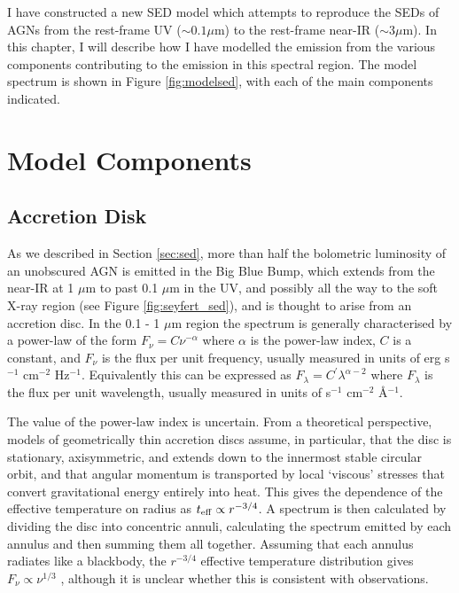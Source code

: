I have constructed a new SED model which attempts to reproduce the SEDs of AGNs from the rest-frame UV ($\sim 0.1 \mu$m) to the rest-frame near-IR ($\sim 3 \mu$m). In this chapter, I will describe how I have modelled the emission from the various components contributing to the emission in this spectral region. The model spectrum is shown in Figure \ref{fig:modelsed}, with each of the main components indicated. 

\section{Model Components}

\subsection{Accretion Disk}

As we described in Section \ref{sec:sed}, more than half the bolometric luminosity of an unobscured AGN is emitted in the Big Blue Bump, which extends from the near-IR at 1 $\mu$m to past 0.1 $\mu$m in the UV, and possibly all the way to the soft X-ray region (see Figure \ref{fig:seyfert_sed}), and is thought to arise from an accretion disc. In the 0.1 - 1 $\mu$m region the spectrum is generally characterised by a power-law of the form $F_\nu = C\nu^{-\alpha}$ where $\alpha$ is the power-law index, $C$ is a constant, and $F_\nu$ is the flux per unit frequency, usually measured in units of erg s$^{-1}$ cm$^{-2}$ Hz$^{-1}$. Equivalently this can be expressed as $F_\lambda = C^\prime\lambda^{\alpha - 2}$ where $F_\lambda$ is the flux per unit wavelength, usually measured in units of s$^{-1}$ cm$^{-2}$ \AA$^{-1}$. 

The value of the power-law index is uncertain. From a theoretical perspective, models of geometrically thin accretion discs \citep{shakura73} assume, in particular, that the disc is stationary, axisymmetric, and extends down to the innermost stable circular orbit, and that angular momentum is transported by local `viscous' stresses that convert gravitational energy entirely into heat. This gives the dependence of the effective temperature on radius as $t_{\rm eff} \propto r^{-3/4}$. A spectrum is then calculated by dividing the disc into concentric annuli, calculating the spectrum emitted by each annulus and then summing them all together. Assuming that each annulus radiates like a blackbody, the $r^{-3/4}$ effective temperature distribution gives $F_\nu \propto \nu^{1/3}$ \citep{peterson95}, although it is unclear whether this is consistent with observations.    


